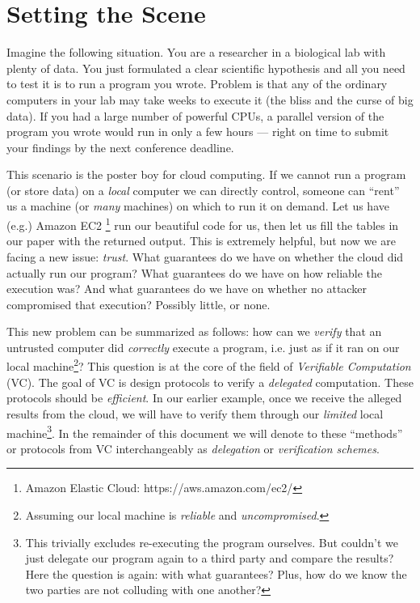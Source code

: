 
{
\color{gray}


\section{Setting the Scene}

Imagine the following situation.
You are a researcher in a biological lab with plenty of data. You just formulated a clear scientific hypothesis and all you need to test it is to run a program you wrote. Problem is that any of the ordinary computers in your lab may take weeks to execute it (the bliss and the curse of big data). If you had a large number of powerful CPUs, a parallel version of the program you wrote would run in only a few hours --- right on time to submit your findings by the next conference deadline.

This scenario is the poster boy for cloud computing. If we cannot run a program (or store data) on a \textit{local} computer we can directly control, someone can ``rent'' us a machine (or \textit{many} machines) on which to run it on demand. Let us have (e.g.) Amazon EC2 \footnote{Amazon Elastic Cloud: https://aws.amazon.com/ec2/} run our beautiful code for us, then let us fill the tables in our paper with the returned output. This is extremely helpful, but now we are facing a new issue: \textit{trust}. 
What guarantees do we have on whether the cloud did actually run our program? What guarantees do we have on how reliable the execution was? And what guarantees do we have on whether no attacker compromised that execution? Possibly little, or none.

This new problem can be summarized as follows: how can we \textit{verify} that an untrusted computer did \textit{correctly} execute a program, i.e. just as if it ran on our local machine\footnote{Assuming our local machine is \textit{reliable} and \textit{uncompromised}.}? 
This question is at the core of the field of \textit{Verifiable Computation} (VC). The goal of VC is design protocols to verify a \textit{delegated} computation. These protocols should be \textit{efficient}. In our earlier example, once we receive the alleged results from the cloud, we will have to verify them through our \textit{limited} local machine\footnote{This trivially excludes re-executing the program ourselves. But couldn't we just delegate our program again to a third party and compare the results? Here the question is again: with what guarantees? Plus, how do we know the two parties are not colluding with one another?}. In the remainder of this document we will denote to these ``methods'' or protocols from VC interchangeably as \textit{delegation} or \textit{verification schemes}.

}
